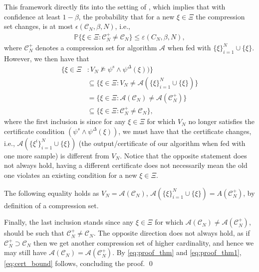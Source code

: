 This framework directly fits into the setting of \cite[Theorem~7]{DBLP:journals/jmlr/CampiG23}, which implies that with confidence at least $1-\beta$, the probability that for a new $\xi \in \Xi$ the compression set changes, is at most $\epsilon(\mathcal{C}_N,\beta,N)$, i.e., 
\begin{align}
\mathbb{P}\{\xi \in \Xi\colon  \mathcal{C}_N^{+} \neq \mathcal{C}_N\} \leq \varepsilon(C_N,\beta,N), \label{eq:proof_thm}
\end{align}
where $\mathcal{C}_N^{+}$ denotes a compression set for algorithm $\mathcal{A}$ when fed with $\{\xi\}_{i=1}^N \cup \{\xi\}$.
However, we then have that
\begin{align}
\{\xi \in \Xi &\colon V_N \not\models \psi^s \wedge \psi^\Delta(\xi)) \} \nonumber \\
&\subseteq \{\xi \in \Xi \colon V_N \neq \mathcal{A}(\{\xi\}_{i=1}^N \cup \{\xi\}) \} \nonumber \\
&= \{\xi \in \Xi \colon \mathcal{A}(\mathcal{C}_N) \neq \mathcal{A}(\mathcal{C}_N^{+})\} \nonumber \\
&\subseteq \{\xi \in \Xi \colon \mathcal{C}_N^{+} \neq \mathcal{C}_N \}, \label{eq:proof_thm1}
\end{align}
where the first inclusion is since for any $\xi \in \Xi$ for which $V_N$ no longer satisfies the certificate condition 
$(\psi^s \wedge \psi^\Delta(\xi))$, we must have that the certificate changes, i.e., $\mathcal{A}(\{\xi^i\}_{i=1}^N \cup \{\xi\})$ (the output/certificate of our algorithm when fed with one more sample) is different from $V_N$. 
Notice that the opposite statement does not always hold, having a different certificate does not necessarily mean the old one violates an existing condition for a new $\xi \in \Xi$. 

The following equality holds as $V_N = \mathcal{A}(\mathcal{C}_N)$, $\mathcal{A}(\{\xi\}_{i=1}^N \cup \{\xi\}) = A(\mathcal{C}_N^{+})$, by definition of a compression set.

Finally, the last inclusion stands since any $\xi \in \Xi$ for which $\mathcal{A}(\mathcal{C}_N) \neq \mathcal{A}(\mathcal{C}_N^{+})$, should be such that $\mathcal{C}_N^{+} \neq \mathcal{C}_N$. 
The opposite direction does not always hold, as if 
$\mathcal{C}_N^{+} \supset \mathcal{C}_N$ then we get another compression set of higher cardinality, and hence we may still have $\mathcal{A}(\mathcal{C}_N) = \mathcal{A}(\mathcal{C}_N^{+})$. By \eqref{eq:proof_thm} and \eqref{eq:proof_thm1}, \eqref{eq:cert_bound} follows, concluding the proof.
 \qed

